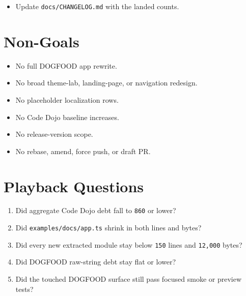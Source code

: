 \begin{itemize}
\item
  Update \texttt{d\allowbreak{}o\allowbreak{}c\allowbreak{}s\allowbreak{}/\allowbreak{}C\allowbreak{}H\allowbreak{}A\allowbreak{}N\allowbreak{}G\allowbreak{}E\allowbreak{}L\allowbreak{}O\allowbreak{}G\allowbreak{}.\allowbreak{}m\allowbreak{}d} with the landed counts.
\end{itemize}

\section{Non-Goals}\label{record-198-non-goals}

\begin{itemize}
\tightlist
\item
  No full DOGFOOD app rewrite.
\item
  No broad theme-lab, landing-page, or navigation redesign.
\item
  No placeholder localization rows.
\item
  No Code Dojo baseline increases.
\item
  No release-version scope.
\item
  No rebase, amend, force push, or draft PR.
\end{itemize}

\section{Playback Questions}\label{record-198-playback-questions}

\begin{enumerate}
\def\labelenumi{\arabic{enumi}.}
\tightlist
\item
  Did aggregate Code Dojo debt fall to \texttt{8\allowbreak{}6\allowbreak{}0} or lower?
\item
  Did \texttt{e\allowbreak{}x\allowbreak{}a\allowbreak{}m\allowbreak{}p\allowbreak{}l\allowbreak{}e\allowbreak{}s\allowbreak{}/\allowbreak{}d\allowbreak{}o\allowbreak{}c\allowbreak{}s\allowbreak{}/\allowbreak{}a\allowbreak{}p\allowbreak{}p\allowbreak{}.\allowbreak{}t\allowbreak{}s} shrink in both lines and bytes?
\item
  Did every new extracted module stay below \texttt{1\allowbreak{}5\allowbreak{}0} lines and \texttt{1\allowbreak{}2\allowbreak{},\allowbreak{}0\allowbreak{}0\allowbreak{}0} bytes?
\item
  Did DOGFOOD raw-string debt stay flat or lower?
\item
  Did the touched DOGFOOD surface still pass focused smoke or preview tests?
\end{enumerate}

